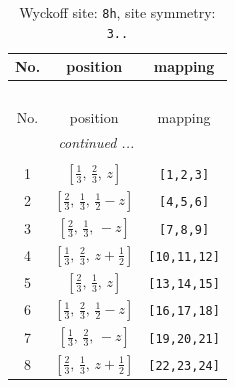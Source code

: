 \documentclass[fleqn,8pt]{jsarticle}
\begin{document}
\begin{longtable}{ccc}
\caption{Wyckoff site: {\tt 8h}, site symmetry: {\tt 3..}}
 \\
 \hline \hline
No. & position & mapping \\ \hline \endfirsthead

\multicolumn{2}{l}{\tablename\ \thetable{}} \\
 \hline \hline
No. & position & mapping \\ \hline \endhead

 \hline \hline
\multicolumn{2}{r}{\footnotesize\it continued ...} \\ \endfoot

 \hline \hline
\multicolumn{2}{r}{} \\ \endlastfoot

1 & $\left[ \frac{1}{3},\, \frac{2}{3},\, z \right]$ & {\tt [1,2,3]} \\ \hline
2 & $\left[ \frac{2}{3},\, \frac{1}{3},\, \frac{1}{2} - z \right]$ & {\tt [4,5,6]} \\ \hline
3 & $\left[ \frac{2}{3},\, \frac{1}{3},\, - z \right]$ & {\tt [7,8,9]} \\ \hline
4 & $\left[ \frac{1}{3},\, \frac{2}{3},\, z + \frac{1}{2} \right]$ & {\tt [10,11,12]} \\ \hline
5 & $\left[ \frac{2}{3},\, \frac{1}{3},\, z \right]$ & {\tt [13,14,15]} \\ \hline
6 & $\left[ \frac{1}{3},\, \frac{2}{3},\, \frac{1}{2} - z \right]$ & {\tt [16,17,18]} \\ \hline
7 & $\left[ \frac{1}{3},\, \frac{2}{3},\, - z \right]$ & {\tt [19,20,21]} \\ \hline
8 & $\left[ \frac{2}{3},\, \frac{1}{3},\, z + \frac{1}{2} \right]$ & {\tt [22,23,24]} \\
\end{longtable}
\renewcommand{\arraystretch}{1.2}
\end{document}
